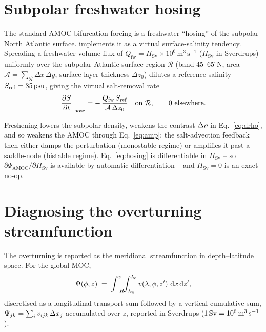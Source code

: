 \section{Subpolar freshwater hosing}

The standard AMOC-bifurcation forcing is a freshwater ``hosing'' of the subpolar
North Atlantic surface. \model{} implements it as a virtual surface-salinity
tendency. Spreading a freshwater volume flux of $Q_{\mathrm{fw}} = H_{\mathrm{Sv}}\times10^{6}\,\mathrm{m^{3}\,s^{-1}}$
($H_{\mathrm{Sv}}$ in Sverdrups) uniformly over the subpolar Atlantic surface
region $\mathcal{R}$ (band $45$--$65^{\circ}\mathrm{N}$, area $\mathcal{A}=\sum_{\mathcal{R}}\Delta x\,\Delta y$,
surface-layer thickness $\Delta z_0$) dilutes a reference salinity $S_{\mathrm{ref}}=35\,\mathrm{psu}$,
giving the virtual salt-removal rate
\begin{equation}
  \left.\frac{\partial S}{\partial t}\right|_{\mathrm{hose}}
   = -\,\frac{Q_{\mathrm{fw}}\,S_{\mathrm{ref}}}{\mathcal{A}\,\Delta z_0}
     \quad \text{on } \mathcal{R},\qquad 0 \text{ elsewhere.}
  \label{eq:hosing}
\end{equation}

Freshening lowers the subpolar density, weakens the contrast $\Delta\rho$ in
Eq.~\eqref{eq:drho}, and so weakens the AMOC through Eq.~\eqref{eq:amp}; the
salt-advection feedback then either damps the perturbation (monostable regime) or
amplifies it past a saddle-node (bistable regime). Eq.~\eqref{eq:hosing} is
differentiable in $H_{\mathrm{Sv}}$ -- so $\partial\Psi_{\mathrm{AMOC}}/\partial H_{\mathrm{Sv}}$
is available by automatic differentiation -- and $H_{\mathrm{Sv}}=0$ is an exact
no-op.

\section{Diagnosing the overturning streamfunction}

The overturning is reported as the meridional streamfunction in depth--latitude
space. For the global MOC,
\begin{equation}
  \Psi(\phi,z) \;=\; \int_{-H}^{z}\!\!\int_{\lambda_{\mathrm w}}^{\lambda_{\mathrm e}}
                     v(\lambda,\phi,z')\,\,\mathrm{d} x \,\mathrm{d} z',
  \label{eq:moc}
\end{equation}
discretised as a longitudinal transport sum followed by a vertical cumulative sum,
$\Psi_{jk} = \sum_{i}v_{ijk}\,\Delta x_j$ accumulated over $z$, reported in
Sverdrups ($1\,\mathrm{Sv} = 10^{6}\,\mathrm{m^{3}\,s^{-1}}$).

